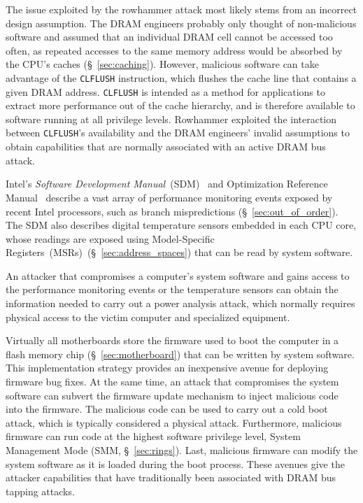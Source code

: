 The issue exploited by the rowhammer attack most likely stems from an incorrect
design assumption. The DRAM engineers probably only thought of non-malicious
software and assumed that an individual DRAM cell cannot be accessed too
often, as repeated accesses to the same memory address would be absorbed by the
CPU's caches (\S~\ref{sec:caching}). However, malicious software can take
advantage of the \texttt{CLFLUSH} instruction, which flushes the cache line
that contains a given DRAM address. \texttt{CLFLUSH} is intended as a method
for applications to extract more performance out of the cache hierarchy, and
is therefore available to software running at all privilege levels. Rowhammer
exploited the interaction between \texttt{CLFLUSH}'s availability and the DRAM
engineers' invalid assumptions to obtain capabilities that are normally
associated with an active DRAM bus attack.


\label{sec:perfmon_attacks}


Intel's \textit{Software Development Manual}~(SDM)~\cite{intel2015sdm} and
Optimization Reference Manual~\cite{intel2014optimization} describe a vast
array of performance monitoring events exposed by recent Intel processors,
such as branch mispredictions (\S~\ref{sec:out_of_order}). The SDM also
describes digital temperature sensors embedded in each CPU core, whose readings
are exposed using Model-Specific Registers~(MSRs)~(\S~\ref{sec:address_spaces})
that can be read by system software.

An attacker that compromises a computer's system software and gains access to
the performance monitoring events or the temperature sensors can obtain the
information needed to carry out a power analysis attack, which normally
requires physical access to the victim computer and specialized equipment.


\label{sec:firmware_attacks}

Virtually all motherboards store the firmware used to boot the computer in a
flash memory chip (\S~\ref{sec:motherboard}) that can be written by system
software. This implementation strategy provides an inexpensive avenue for
deploying firmware bug fixes. At the same time, an attack that compromises the
system software can subvert the firmware update mechanism to inject malicious
code into the firmware. The malicious code can be used to carry out a cold boot
attack, which is typically considered a physical attack. Furthermore, malicious
firmware can run code at the highest software privilege level, System
Management Mode (SMM, \S~\ref{sec:rings}). Last, malicious firmware can modify
the system software as it is loaded during the boot process. These avenues give
the attacker capabilities that have traditionally been associated with DRAM bus
tapping attacks.

